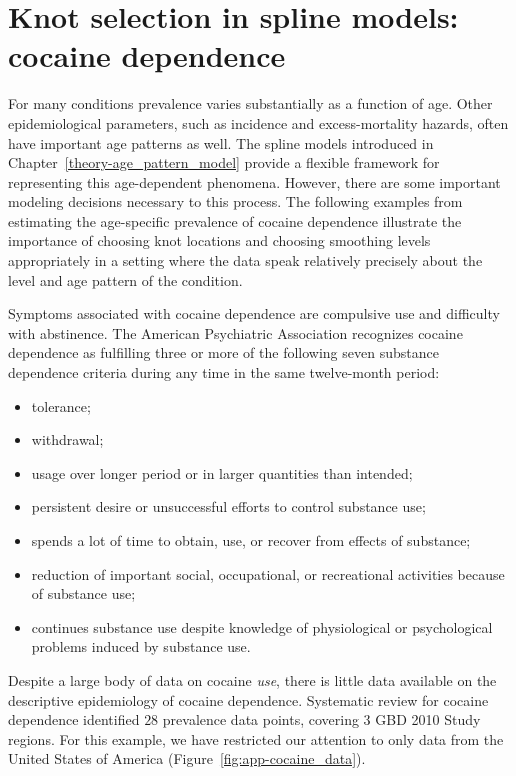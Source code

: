 \chapter{Knot selection in spline models: cocaine dependence}
\label{applications-splines_knot_loc}

For many conditions prevalence varies substantially as a function of
age.  Other epidemiological parameters, such as incidence and
excess-mortality hazards, often have important age patterns as well.
The spline models introduced in Chapter~\ref{theory-age_pattern_model}
provide a flexible framework for representing this age-dependent
phenomena.  However, there are some important modeling decisions
necessary to this process.  The following examples from estimating the
age-specific prevalence of cocaine dependence illustrate the
importance of choosing knot locations and choosing smoothing levels
appropriately in a setting where the data speak relatively precisely
about the level and age pattern of the condition.

Symptoms associated with cocaine dependence are compulsive use and
difficulty with abstinence.  The American Psychiatric Association
recognizes cocaine dependence as fulfilling three or more of the
following seven substance dependence criteria during any time in the
same twelve-month period: \cite{american_psychiatric_association_diagnostic_2000, wagner_first_2002}
    \begin{itemize} \label{page:app-substance_dependence}
        \item tolerance;
        \item withdrawal;
        \item usage over longer period or in larger quantities than intended;
        \item persistent desire or unsuccessful efforts to control
          substance use;
        \item spends a lot of time to obtain, use, or recover
          from effects of substance;
        \item reduction of important social, occupational, or recreational
          activities because of substance use;
        \item continues substance use despite knowledge of
          physiological or psychological problems induced by substance
          use.
    \end{itemize}

Despite a large body of data on cocaine \emph{use}, there is little
data available on the descriptive epidemiology of cocaine
dependence.\cite{degenhardt_what_2011} Systematic review for cocaine
dependence identified $28$ prevalence data points,
covering $3$  GBD 2010 Study regions.  For this example, we have restricted our attention
to only data from the United States of America (Figure~\ref{fig:app-cocaine_data}).

